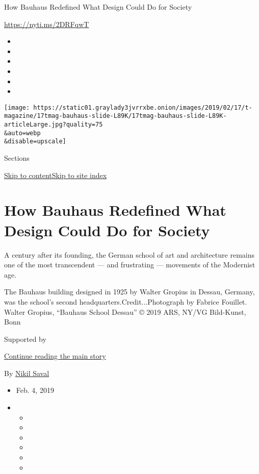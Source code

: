 How Bauhaus Redefined What Design Could Do for Society

\url{https://nyti.ms/2DRFqwT}

\begin{itemize}
\item
\item
\item
\item
\item
\item
\end{itemize}

\texttt{[image: https://static01.graylady3jvrrxbe.onion/images/2019/02/17/t-magazine/17tmag-bauhaus-slide-L89K/17tmag-bauhaus-slide-L89K-articleLarge.jpg?quality=75\\\&auto=webp\\\&disable=upscale]}

Sections

\protect\hyperlink{site-content}{Skip to
content}\protect\hyperlink{site-index}{Skip to site index}

\hypertarget{how-bauhaus-redefined-what-design-could-do-for-society}{%
\section{How Bauhaus Redefined What Design Could Do for
Society}\label{how-bauhaus-redefined-what-design-could-do-for-society}}

A century after its founding, the German school of art and architecture
remains one of the most transcendent --- and frustrating --- movements
of the Modernist age.

The Bauhaus building designed in 1925 by Walter Gropius in Dessau,
Germany, was the school's second headquarters.Credit...Photograph by
Fabrice Fouillet. Walter Gropius, ``Bauhaus School Dessau'' © 2019 ARS,
NY/VG Bild-Kunst, Bonn

Supported by

\protect\hyperlink{after-sponsor}{Continue reading the main story}

By \href{https://www.nytimes3xbfgragh.onion/by/nikil-saval}{Nikil Saval}

\begin{itemize}
\item
  Feb. 4, 2019
\item
  \begin{itemize}
  \item
  \item
  \item
  \item
  \item
  \item
  \end{itemize}
\end{itemize}

